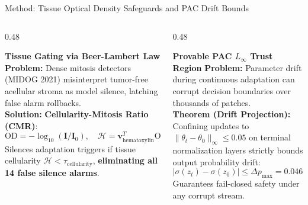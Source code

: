 \documentclass[aspectratio=169,10pt]{beamer}
\begin{document}
\begin{frame}{Method: Tissue Optical Density Safeguards and PAC Drift Bounds}
    \begin{columns}[T]
        \begin{column}{0.48\textwidth}
            \begin{block}{\textbf{Tissue Gating via Beer-Lambert Law}}
                \small
                \textbf{Problem:} Dense mitosis detectors (MIDOG 2021) misinterpret tumor-free acellular stroma as model silence, latching false alarm rollbacks.
                \vspace{0.1cm}\\
                \textbf{Solution:} \textbf{Cellularity-Mitosis Ratio (CMR)}:
                \begin{equation*}
                    \text{OD} = -\log_{10}(\mathbf{I} / \mathbf{I}_0), \quad \mathcal{H} = \mathbf{v}_{\text{hematoxylin}}^T \text{OD}
                \end{equation*}
                Silences adaptation triggers if tissue cellularity $\mathcal{H} < \tau_{\text{cellularity}}$, \textbf{eliminating all 14 false silence alarms}.
            \end{block}
        \end{column}
        \begin{column}{0.48\textwidth}
            \begin{block}{\textbf{Provable PAC $L_\infty$ Trust Region}}
                \small
                \textbf{Problem:} Parameter drift during continuous adaptation can corrupt decision boundaries over thousands of patches.
                \vspace{0.1cm}\\
                \textbf{Theorem (Drift Projection):}
                Confining updates to $\|\theta_t - \theta_0\|_\infty \le 0.05$ on terminal normalization layers strictly bounds output probability drift:
                \begin{equation*}
                    |\sigma(z_t) - \sigma(z_0)| \le \Delta p_{\max} = \mathbf{0.0460}
                \end{equation*}
                Guarantees fail-closed safety under any corrupt stream.
            \end{block}
        \end{column}
    \end{columns}
\end{frame}
\end{document}
